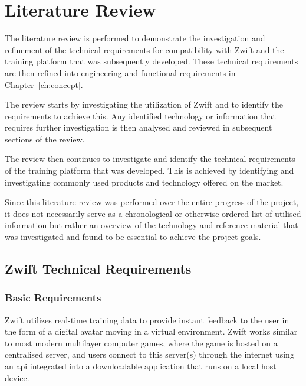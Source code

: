 
\chapter{Literature Review}
\label{sec:lit}


The literature review is performed to demonstrate the investigation and refinement of the technical requirements for compatibility with Zwift and the training platform that was subsequently developed. These technical requirements are then refined into engineering and functional requirements in Chapter~\ref{ch:concept}.

The review starts by investigating the utilization of Zwift and to identify the requirements to achieve this. Any identified technology or information that requires further investigation is then analysed and reviewed in subsequent sections of the review.

The review then continues to investigate and identify the technical requirements of the training platform that was developed. This is achieved by identifying and investigating commonly used products and technology offered on the market.

Since this literature review was performed over the entire progress of the project, it does not necessarily serve as a chronological or otherwise ordered list of utilised information but rather an overview of the technology and reference material that was investigated and found to be essential to achieve the project goals.

\section{Zwift Technical Requirements}

\subsection{Basic Requirements}
Zwift utilizes real-time training data to provide instant feedback to the user in the form of a digital avatar moving in a virtual environment. Zwift works similar to most modern multilayer computer games, where the game is hosted on a centralised server, and users connect to this server(s) through the internet using an \ac{api} integrated into a downloadable application that runs on a local host device.

